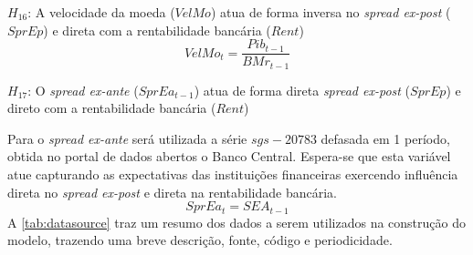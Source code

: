 \documentclass[12pt,12pt,openright,oneside,a4paper,chapter=TITLE,section=TITLE,subsection=TITLE,subsubsection=TITLE,english,french,spanish,portugues,sumario=tradicional]{abntex2}
\begin{document}
\(H_{16}\): A velocidade da moeda (\(VelMo\)) atua de forma inversa no \emph{spread ex-post} (\(SprEp\)) e direta com a rentabilidade bancária (\(Rent\))
\[
VelMo_{t} = \frac{Pib_{t-1}}{BMr_{t-1}}
\]

\(H_{17}\): O \emph{spread ex-ante} (\(SprEa_{t-1}\)) atua de forma direta \emph{spread ex-post} (\(SprEp\)) e direto com a rentabilidade bancária (\(Rent\))

Para o \emph{spread ex-ante} será utilizada a série \(sgs-20783\) defasada em 1 período, obtida no portal de dados abertos o Banco Central. Espera-se que esta variável atue capturando as expectativas das instituições financeiras exercendo influência direta no \emph{spread ex-post} e direta na rentabilidade bancária.
\[
SprEa_{t} = SEA_{t-1}
\]
A \autoref{tab:datasource} traz um resumo dos dados a serem utilizados na construção do modelo, trazendo uma breve descrição, fonte, código e periodicidade.
\end{document}
